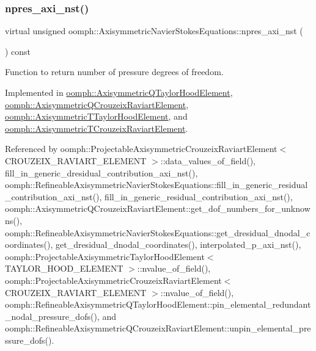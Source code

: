 \subsubsection{\texorpdfstring{npres\+\_\+axi\+\_\+nst()}{npres\_axi\_nst()}}
{\footnotesize\ttfamily virtual unsigned oomph\+::\+Axisymmetric\+Navier\+Stokes\+Equations\+::npres\+\_\+axi\+\_\+nst (\begin{DoxyParamCaption}{ }\end{DoxyParamCaption}) const\hspace{0.3cm}{\ttfamily [pure virtual]}}



Function to return number of pressure degrees of freedom. 



Implemented in \hyperlink{classoomph_1_1AxisymmetricQTaylorHoodElement_a636d0c75c75483f9da193d0192f4e05e}{oomph\+::\+Axisymmetric\+Q\+Taylor\+Hood\+Element}, \hyperlink{classoomph_1_1AxisymmetricQCrouzeixRaviartElement_a923c2ccbc5bd523118273e63cc18fd5f}{oomph\+::\+Axisymmetric\+Q\+Crouzeix\+Raviart\+Element}, \hyperlink{classoomph_1_1AxisymmetricTTaylorHoodElement_a39217f9f550c3488f8f660ae861a61a7}{oomph\+::\+Axisymmetric\+T\+Taylor\+Hood\+Element}, and \hyperlink{classoomph_1_1AxisymmetricTCrouzeixRaviartElement_a2614b5ab31a1cbac9a7f7887ce24c11a}{oomph\+::\+Axisymmetric\+T\+Crouzeix\+Raviart\+Element}.



Referenced by oomph\+::\+Projectable\+Axisymmetric\+Crouzeix\+Raviart\+Element$<$ C\+R\+O\+U\+Z\+E\+I\+X\+\_\+\+R\+A\+V\+I\+A\+R\+T\+\_\+\+E\+L\+E\+M\+E\+N\+T $>$\+::data\+\_\+values\+\_\+of\+\_\+field(), fill\+\_\+in\+\_\+generic\+\_\+dresidual\+\_\+contribution\+\_\+axi\+\_\+nst(), oomph\+::\+Refineable\+Axisymmetric\+Navier\+Stokes\+Equations\+::fill\+\_\+in\+\_\+generic\+\_\+residual\+\_\+contribution\+\_\+axi\+\_\+nst(), fill\+\_\+in\+\_\+generic\+\_\+residual\+\_\+contribution\+\_\+axi\+\_\+nst(), oomph\+::\+Axisymmetric\+Q\+Crouzeix\+Raviart\+Element\+::get\+\_\+dof\+\_\+numbers\+\_\+for\+\_\+unknowns(), oomph\+::\+Refineable\+Axisymmetric\+Navier\+Stokes\+Equations\+::get\+\_\+dresidual\+\_\+dnodal\+\_\+coordinates(), get\+\_\+dresidual\+\_\+dnodal\+\_\+coordinates(), interpolated\+\_\+p\+\_\+axi\+\_\+nst(), oomph\+::\+Projectable\+Axisymmetric\+Taylor\+Hood\+Element$<$ T\+A\+Y\+L\+O\+R\+\_\+\+H\+O\+O\+D\+\_\+\+E\+L\+E\+M\+E\+N\+T $>$\+::nvalue\+\_\+of\+\_\+field(), oomph\+::\+Projectable\+Axisymmetric\+Crouzeix\+Raviart\+Element$<$ C\+R\+O\+U\+Z\+E\+I\+X\+\_\+\+R\+A\+V\+I\+A\+R\+T\+\_\+\+E\+L\+E\+M\+E\+N\+T $>$\+::nvalue\+\_\+of\+\_\+field(), oomph\+::\+Refineable\+Axisymmetric\+Q\+Taylor\+Hood\+Element\+::pin\+\_\+elemental\+\_\+redundant\+\_\+nodal\+\_\+pressure\+\_\+dofs(), and oomph\+::\+Refineable\+Axisymmetric\+Q\+Crouzeix\+Raviart\+Element\+::unpin\+\_\+elemental\+\_\+pressure\+\_\+dofs().

